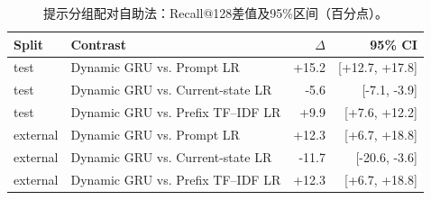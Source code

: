 \begin{table}[t]
\centering\footnotesize
\caption{提示分组配对自助法：Recall@128差值及95\%区间（百分点）。}\label{tab:uncertainty}
\begin{tabular}{lp{}rr}\toprule
Split & Contrast & $\Delta$ & 95\% CI \\
\midrule
test & Dynamic GRU vs. Prompt LR & +15.2 & [+12.7, +17.8] \\
test & Dynamic GRU vs. Current-state LR & -5.6 & [-7.1, -3.9] \\
test & Dynamic GRU vs. Prefix TF--IDF LR & +9.9 & [+7.6, +12.2] \\
external & Dynamic GRU vs. Prompt LR & +12.3 & [+6.7, +18.8] \\
external & Dynamic GRU vs. Current-state LR & -11.7 & [-20.6, -3.6] \\
external & Dynamic GRU vs. Prefix TF--IDF LR & +12.3 & [+6.7, +18.8] \\
\bottomrule\end{tabular}
\end{table}
